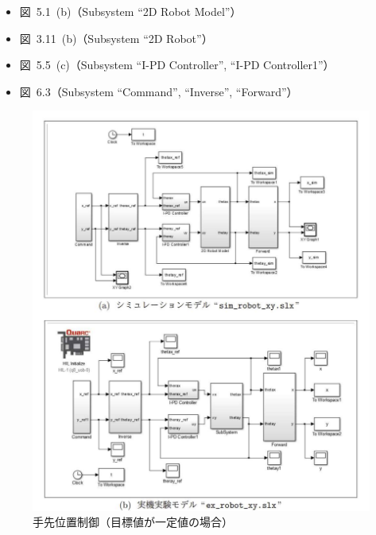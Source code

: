 \begin{itemize}
  \item 図~5.1~(b)（Subsystem ``2D Robot Model''）
  \item 図~3.11~(b)（Subsystem ``2D Robot''）
  \item 図~5.5~(c)（Subsystem ``I-PD Controller'', ``I-PD Controller1''）
  \item 図~6.3（Subsystem ``Command'', ``Inverse'', ``Forward''）
\end{itemize}

\begin{figure}[H]
    \centering
    \includegraphics[width=0.85\linewidth]{figure/robot_xy_models.pdf}
    \caption{手先位置制御（目標値が一定値の場合）}
    \label{fig:sim_robot_xy}
\end{figure}

